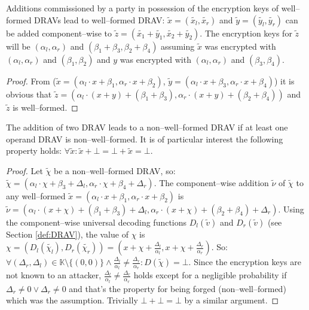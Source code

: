 \begin{lem}
  \label{lem:DRAV-add}

Additions commissioned by a party in possession of the encryption keys of
well--formed DRAVs lead to well--formed DRAV: $\widetilde{x} =
(\widetilde{x_l}, \widetilde{x_r})$ and $\widetilde{y} = (\widetilde{y_l},
\widetilde{y_r})$ can be added component--wise to $\widetilde{z} =
\left(\widetilde{x_1} + \widetilde{y_1}, \widetilde{x_2} +
\widetilde{y_2}\right)$. The encryption keys for $\widetilde{z}$ will be
$(\alpha_l, \alpha_r)$ and $(\beta_1 + \beta_3, \beta_2 + \beta_4)$ assuming
$\widetilde{x}$ was encrypted with $(\alpha_l, \alpha_r)$ and $(\beta_1,
\beta_2)$ and $y$ was encrypted with $(\alpha_l, \alpha_r)$ and $(\beta_3,
\beta_4)$.

\end{lem}
\begin{proof}

From ($\widetilde{x} = \left(\alpha_l \cdot x + \beta_1,
\alpha_r \cdot x + \beta_2\right)$, $\widetilde{y} = \left(\alpha_l \cdot x +
\beta_3, \alpha_r \cdot x + \beta_4\right)$) it is obvious that $\widetilde{z}
= \left(\alpha_l \cdot (x+y) + (\beta_1 + \beta_3), \alpha_r \cdot (x+y) +
(\beta_2 + \beta_4)\right)$ and $\widetilde{z}$ is well--formed.

\end{proof}

\begin{lem}
  \label{lem:DRAV-add-bad}

The addition of two DRAV leads to a non--well--formed DRAV if at least one
operand DRAV is non--well--formed. It is of particular interest the following
property holds: $\forall \widetilde{x}: \widetilde{x} + \bot = \bot +
\widetilde{x} = \bot$.

\end{lem}
\begin{proof}

Let $\widetilde{\chi}$ be a non--well--formed DRAV, so: $\widetilde{\chi} =
(\alpha_l \cdot \chi + \beta_3 + \Delta_l, \alpha_r \cdot \chi + \beta_4 +
\Delta_r)$. The component--wise addition $\widetilde{\nu}$ of $\widetilde{\chi}$
to any well--formed $\widetilde{x} = (\alpha_l \cdot x + \beta_1, \alpha_r \cdot
x + \beta_2)$ is $\widetilde{\nu} = (\alpha_l \cdot (x+\chi) + (\beta_1+\beta_3)
+ \Delta_l, \alpha_r \cdot (x+\chi) + (\beta_2+\beta_4) + \Delta_r)$.  Using the
component--wise universal decoding functions $D_l(\widetilde{v})$ and
$D_r(\widetilde{v})$ (see Section \ref{def:DRAV}), the value of $\chi$ is $\chi
= (D_l(\widetilde{\chi_l}), D_r(\widetilde{\chi_r})) = (x + \chi +
\frac{\Delta_l}{\alpha_l}, x + \chi + \frac{\Delta_r}{\alpha_r})$. So: $\forall
(\Delta_r, \Delta_l) \in \mathbb{K} \setminus \{(0, 0)\} \wedge
\frac{\Delta_l}{\alpha_l} \neq \frac{\Delta_r}{\alpha_r}: D(\widetilde{\chi}) =
\bot$. Since the encryption keys are not known to an attacker,
$\frac{\Delta_l}{\alpha_l} \neq \frac{\Delta_r}{\alpha_r}$ holds except for a
negligible probability if $\Delta_r \neq 0 \vee \Delta_r \neq 0$ and that's the
property for being forged (non--well--formed) which was the assumption.
Trivially $\bot + \bot = \bot$ by a similar argument.

\end{proof}


